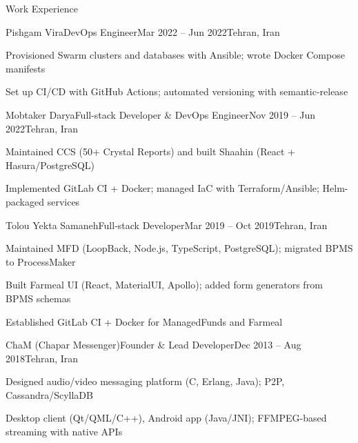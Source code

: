 \documentclass[]{main}
\begin{document}
\begin{section}{Work Experience}
 \begin{subsection}{Pishgam Vira}{DevOps Engineer}{Mar 2022 -- Jun 2022}{Tehran, Iran}
     \item Provisioned Swarm clusters and databases with Ansible; wrote Docker Compose manifests
     \item Set up CI/CD with GitHub Actions; automated versioning with semantic-release
 \end{subsection}
 \begin{subsection}{Mobtaker Darya}{Full-stack Developer \& DevOps Engineer}{Nov 2019 -- Jun 2022}{Tehran, Iran}
     \item Maintained CCS (50+ Crystal Reports) and built Shaahin (React + Hasura/PostgreSQL)
     \item Implemented GitLab CI + Docker; managed IaC with Terraform/Ansible; Helm-packaged services
 \end{subsection}
 \begin{subsection}{Tolou Yekta Samaneh}{Full-stack Developer}{Mar 2019 -- Oct 2019}{Tehran, Iran}
     \item Maintained MFD (LoopBack, Node.js, TypeScript, PostgreSQL); migrated BPMS to ProcessMaker
     \item Built Farmeal UI (React, MaterialUI, Apollo); added form generators from BPMS schemas
     \item Established GitLab CI + Docker for ManagedFunds and Farmeal
 \end{subsection}
 \begin{subsection}{ChaM (Chapar Messenger)}{Founder \& Lead Developer}{Dec 2013 -- Aug 2018}{Tehran, Iran}
     \item Designed audio/video messaging platform (C, Erlang, Java); P2P, Cassandra/ScyllaDB
     \item Desktop client (Qt/QML/C++), Android app (Java/JNI); FFMPEG-based streaming with native APIs
 \end{subsection}
\end{section}

\end{document}
